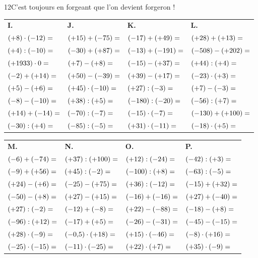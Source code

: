 \begin{exercice}{12}{C'est toujours en forgeant que l'on devient forgeron !}
{\bigskip
\begin{tabularx}{\linewidth}{*{4}{X}}
\textbf{I.} & \textbf{J.} & \textbf{K.} & \textbf{L.} \\
$(+8)\cdot(-12)= \dotfill$  & $(+15)+(-75)= \dotfill$   & $(-17)+(+49)= \dotfill$     & $(+28)+(+13)= \dotfill$      \\
$(+4):(-10)= \dotfill$      & $(-30)+(+87)= \dotfill$   & $(-13)+(-191)= \dotfill$    & $(-508)-(+202)= \dotfill$    \\
$(+1933)\cdot 0= \dotfill$  & $(+7)-(+8)= \dotfill$     & $(-15)-(+37)= \dotfill$     & $(+44):(+4)= \dotfill$       \\
$(-2)+(+14)= \dotfill$      & $(+50)-(-39)= \dotfill$   & $(+39)-(+17)= \dotfill$     & $(-23)\cdot(+3)= \dotfill$   \\
$(+5)-(+6)= \dotfill$       & $(+45)\cdot(-10)= \dotfill$ & $(+27):(-3)= \dotfill$    & $(+7)-(-3)= \dotfill$        \\
$(-8)-(-10)= \dotfill$      & $(+38):(+5)= \dotfill$    & $(-180):(-20)= \dotfill$    & $(-56):(+7)= \dotfill$       \\
$(+14)+(-14)= \dotfill$     & $(-70):(-7)= \dotfill$    & $(-15)\cdot(-7)= \dotfill$  & $(-130)+(+100)= \dotfill$    \\
$(-30):(+4)= \dotfill$      & $(-85):(-5)= \dotfill$    & $(+31)\cdot(-11)= \dotfill$ & $(-18)\cdot(+5)= \dotfill$   \\
\end{tabularx}

\bigskip
\begin{tabularx}{\linewidth}{*{4}{X}}
\textbf{M.} & \textbf{N.} & \textbf{O.} & \textbf{P.} \\
$(-6)+(-74)= \dotfill$      & $(+37):(+100)= \dotfill$  & $(+12):(-24)= \dotfill$     & $(-42):(+3)= \dotfill$       \\
$(-9)+(+56)= \dotfill$      & $(+45):(-2)= \dotfill$    & $(-100):(+8)= \dotfill$     & $(-63):(-5)= \dotfill$       \\
$(+24)-(+6)= \dotfill$      & $(-25)-(+75)= \dotfill$   & $(+36):(-12)= \dotfill$     & $(-15)+(+32)= \dotfill$      \\
$(-50)-(+8)= \dotfill$      & $(+27)-(+15)= \dotfill$   & $(-16)+(-16)= \dotfill$     & $(+27)+(-40)= \dotfill$      \\
$(+27):(-2)= \dotfill$      & $(-12)+(-8)= \dotfill$    & $(+22)-(-88)= \dotfill$     & $(-18)-(+8)= \dotfill$       \\
$(-96):(+12)= \dotfill$     & $(-17)+(+5)= \dotfill$    & $(-26)-(-31)= \dotfill$     & $(-45)-(-15)= \dotfill$      \\
$(+28)\cdot(-9)= \dotfill$  & $(-0{,}5)\cdot(+18)= \dotfill$ & $(+15)\cdot(-46)= \dotfill$ & $(-8)\cdot(+16)= \dotfill$ \\
$(-25)\cdot(-15)= \dotfill$ & $(-11)\cdot(-25)= \dotfill$ & $(+22)\cdot(+7)= \dotfill$ & $(+35)\cdot(-9)= \dotfill$   \\
\end{tabularx}
}
\end{exercice}
